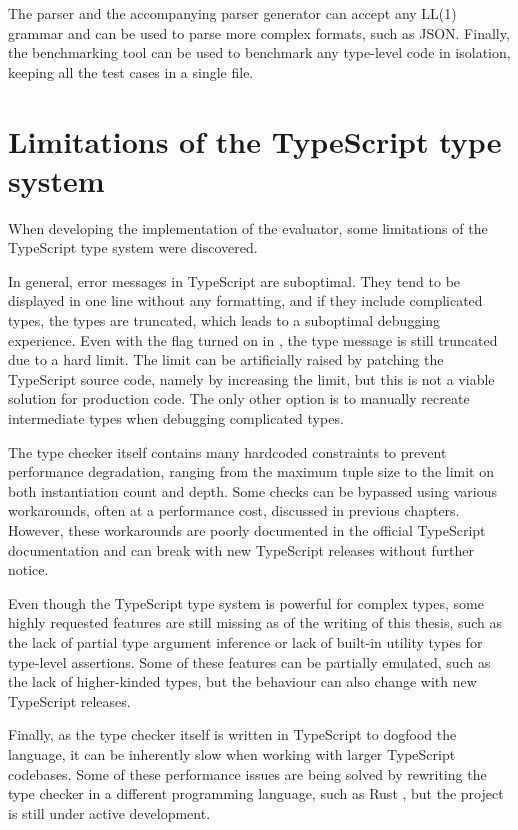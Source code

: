 The parser and the accompanying parser generator can accept any LL(1) grammar and can be used to parse more complex formats, such as JSON. Finally, the benchmarking tool can be used to benchmark any type-level code in isolation, keeping all the test cases in a single file.

\section{Limitations of the TypeScript type system}

When developing the implementation of the evaluator, some limitations of the TypeScript type system were discovered.

In general, error messages in TypeScript are suboptimal. They tend to be displayed in one line without any formatting, and if they include complicated types, the types are truncated, which leads to a suboptimal debugging experience. Even with the  flag turned on in , the type message is still truncated due to a hard limit. The limit can be artificially raised by patching the TypeScript source code, namely by increasing the  limit, but this is not a viable solution for production code. The only other option is to manually recreate intermediate types when debugging complicated types.

The type checker itself contains many hardcoded constraints to prevent performance degradation, ranging from the maximum tuple size to the limit on both instantiation count and depth. Some checks can be bypassed using various workarounds, often at a performance cost, discussed in previous chapters. However, these workarounds are poorly documented in the official TypeScript documentation and can break with new TypeScript releases without further notice.

Even though the TypeScript type system is powerful for complex types, some highly requested features are still missing as of the writing of this thesis, such as the lack of partial type argument inference \cite{ImplementPartialType} or lack of built-in utility types for type-level assertions. Some of these features can be partially emulated, such as the lack of higher-kinded types, but the behaviour can also change with new TypeScript releases.

Finally, as the type checker itself is written in TypeScript to dogfood the language, it can be inherently slow when working with larger TypeScript codebases. Some of these performance issues are being solved by rewriting the type checker in a different programming language, such as Rust \cite{Stc2023}, but the project is still under active development.

